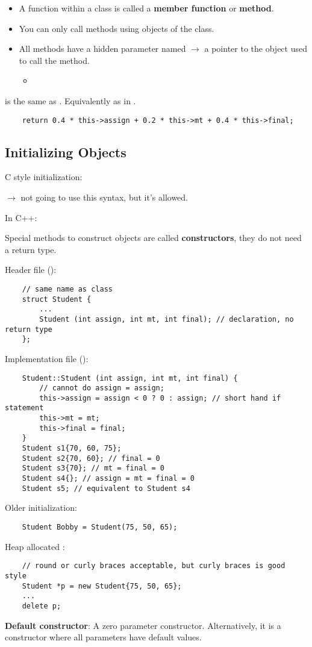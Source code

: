 \begin{itemize}
      \item A function within a class is called a \textbf{member function}
            or \textbf{method}.
      \item You can only call methods using objects of the class.
      \item All methods have a hidden parameter named 
            $ \rightarrow $ a pointer to the object used to call the method.
            \begin{itemize}
                  \item {}
            \end{itemize}
\end{itemize}
 is the same as . Equivalently as in
.
\begin{lstlisting}
    return 0.4 * this->assign + 0.2 * this->mt + 0.4 * this->final;
\end{lstlisting}

\subsection{Initializing Objects}
C style initialization:

 $ \rightarrow $ not going to use this syntax,
but it's allowed.

In C++:

Special methods to construct objects are called \textbf{constructors}, they do
not need a return type.

Header file ():
\begin{lstlisting}
    // same name as class
    struct Student {
        ...
        Student (int assign, int mt, int final); // declaration, no return type
    };
\end{lstlisting}
Implementation file ():
\begin{lstlisting}
    Student::Student (int assign, int mt, int final) {
        // cannot do assign = assign;
        this->assign = assign < 0 ? 0 : assign; // short hand if statement
        this->mt = mt;
        this->final = final;
    }
    Student s1{70, 60, 75};
    Student s2{70, 60}; // final = 0
    Student s3{70}; // mt = final = 0
    Student s4{}; // assign = mt = final = 0
    Student s5; // equivalent to Student s4
\end{lstlisting}
Older initialization:
\begin{lstlisting}
    Student Bobby = Student(75, 50, 65);
\end{lstlisting}
Heap allocated :
\begin{lstlisting}
    // round or curly braces acceptable, but curly braces is good style
    Student *p = new Student{75, 50, 65};
    ...
    delete p;
\end{lstlisting}
\textbf{Default constructor}:
A zero parameter constructor. Alternatively, it is a constructor
where all parameters have default values.

